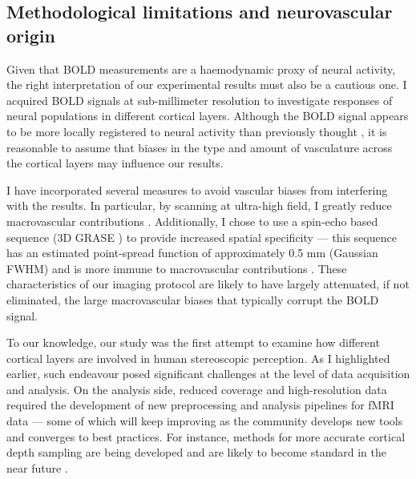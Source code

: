 \subsection{Methodological limitations and neurovascular origin}

Given that BOLD measurements are a haemodynamic proxy of neural activity, the right interpretation of our experimental results must also be a cautious one. I acquired BOLD signals at sub-millimeter resolution to investigate responses of neural populations in different cortical layers. Although the BOLD signal appears to be more locally registered to neural activity than previously thought \cite{Siero:2014it}, it is reasonable to assume that biases in the type and amount of vasculature across the cortical layers \cite{Duvernoy:1981yq} may influence our results.

I have incorporated several measures to avoid vascular biases from interfering with the results. In particular, by scanning at ultra-high field, I greatly reduce macrovascular contributions \cite{Gati:1997uq,Ogawa:1998fk,Ugurbil:2003uq}. Additionally, I chose to use a spin-echo based sequence (3D GRASE \cite{Feinberg:2008qa}) to provide increased spatial specificity --- this sequence has an estimated point-spread function of approximately 0.5 mm (Gaussian FWHM) and is more immune to macrovascular contributions \cite{DeMartino:2013qy}. These characteristics of our imaging protocol are likely to have largely attenuated, if not eliminated, the large macrovascular biases that typically corrupt the BOLD signal.

To our knowledge, our study was the first attempt to examine how different cortical layers are involved in human stereoscopic perception. As I highlighted earlier, such endeavour posed significant challenges at the level of data acquisition and analysis. On the analysis side, reduced coverage and high-resolution data required the development of new preprocessing and analysis pipelines for fMRI data --- some of which will keep improving as the community develops new tools and converges to best practices. For instance, methods for more accurate cortical depth sampling are being developed and are likely to become standard in the near future \cite{Waehnert:2013kl,10.3897/rio.3.e12346}.

